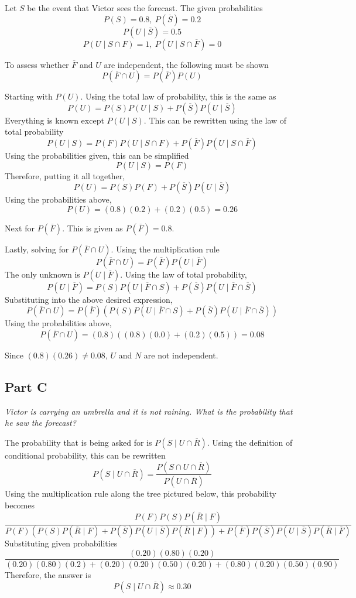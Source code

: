 \documentclass{article}
\begin{document}
\bigbreak

Let $ S $ be the event that Victor sees the forecast. The given probabilities
$$ P(S) = 0.8,\ P(\overline{S}) = 0.2 $$
$$ P(U \mid \overline{S}) = 0.5 $$
$$ P(U \mid S \cap F) = 1,\ P(U \mid S \cap \overline{F}) = 0 $$

To assess whether $ \overline{F} $ and $ U $ are independent, the following must
be shown
$$ P(\overline{F} \cap U) = P(\overline{F}) P(U) $$

Starting with $ P(U) $. Using the total law of probability, this is the same as
$$ P(U) = P(S) P(U \mid S) + P(\overline{S}) P(U \mid \overline{S}) $$
Everything is known except $ P(U \mid S) $. This can be rewritten using the law
of total probability
$$ P(U \mid S) = P(F) P(U \mid S \cap F) + P(\overline{F}) P(U \mid S \cap
\overline{F}) $$
Using the probabilities given, this can be simplified
$$ P(U \mid S) = P(F) $$
Therefore, putting it all together,
$$ P(U) = P(S) P(F) + P(\overline{S}) P(U \mid \overline{S}) $$
Using the probabilities above,
$$ P(U) = (0.8) (0.2) + (0.2) (0.5) = 0.26 $$

Next for $ P(\overline{F}) $. This is given as $ P(\overline{F}) = 0.8 $.

Lastly, solving for $ P(\overline{F} \cap U) $. Using the multiplication rule
$$ P(\overline{F} \cap U) = P(\overline{F}) P(U \mid \overline{F}) $$
The only unknown is $ P(U \mid \overline{F}) $. Using the law of total
probability,
$$ P(U \mid \overline{F}) = P(S) P(U \mid \overline{F} \cap S) + P(\overline{S})
P(U \mid \overline{F} \cap \overline{S}) $$
Substituting into the above desired expression,
$$ P(\overline{F} \cap U) = P(\overline{F}) (P(S) P(U \mid \overline{F} \cap S)
+ P(\overline{S}) P(U \mid \overline{F} \cap \overline{S})) $$
Using the probabilities above,
$$ P(\overline{F} \cap U) = (0.8) ( (0.8) (0.0) + (0.2) (0.5) ) = 0.08 $$

Since $ (0.8) (0.26) \neq 0.08 $, $ U $ and $ N $ are not independent.

\subsection*{Part C}

\textit{Victor is carrying an umbrella and it is not raining. What is the
probability that he saw the forecast?}

\bigbreak

The probability that is being asked for is $ P(S \mid U \cap \overline{R}) $.
Using the definition of conditional probability, this can be rewritten
$$ P(S \mid U \cap \overline{R}) = \frac{ P(S \cap U \cap \overline{R}) }{ P(U
\cap \overline{R}) } $$
Using the multiplication rule along the tree pictured below, this probability
becomes
$$ \frac{ P(F) P(S) P(\overline{R} \mid F) }{ P(F) \left(
P(S) P(\overline{R} \mid F) + P(\overline{S}) P(U \mid
\overline{S}) P(\overline{R} \mid F) \right) + P(\overline{F}) P(\overline{S})
P(U \mid \overline{S}) P(\overline{R} \mid \overline{F}) } $$
Substituting given probabilities
$$ \frac{ (0.20) (0.80) (0.20) }{ (0.20) (0.80) (0.2) + (0.20) (0.20) (0.50)
(0.20) + (0.80) (0.20) (0.50) (0.90) } $$
Therefore, the answer is
$$ P(S \mid U \cap \overline{R}) \approx 0.30 $$
\end{document}
